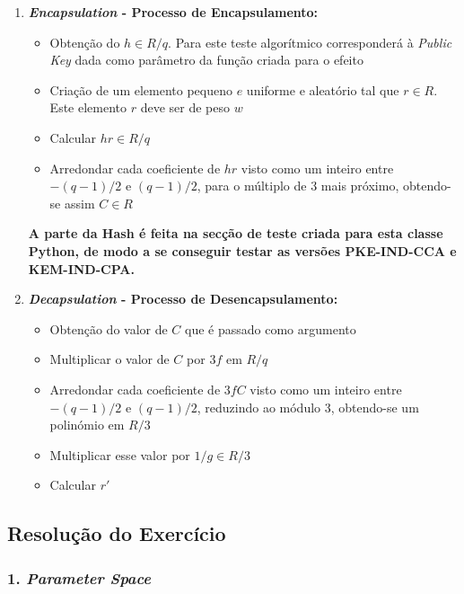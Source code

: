 \documentclass[12pt]{report}
\providecommand{\tightlist}{%
      \setlength{\itemsep}{0pt}\setlength{\parskip}{0pt}}
\begin{document}
\begin{enumerate}
\item
  \textbf{\emph{Encapsulation} - Processo de Encapsulamento:}

  \begin{itemize}
  \tightlist
  \item
    Obtenção do \(h\in{R}/q\). Para este teste algorítmico corresponderá
    à \emph{Public Key} dada como parâmetro da função criada para o
    efeito
  \item
    Criação de um elemento pequeno \(e\) uniforme e aleatório tal que
    \(r\in{R}\). Este elemento \(r\) deve ser de peso \(w\)
  \item
    Calcular \(hr\in{R}/q\)
  \item
    Arredondar cada coeficiente de \(hr\) visto como um inteiro entre
    \(-(q-1)/2\) e \((q-1)/2\), para o múltiplo de 3 mais próximo,
    obtendo-se assim \(C\in{R}\)
  \end{itemize}

  \textbf{A parte da Hash é feita na secção de teste criada para esta
  classe Python, de modo a se conseguir testar as versões PKE-IND-CCA e
  KEM-IND-CPA.}
\vspace{3mm}

\item
  \textbf{\emph{Decapsulation} - Processo de Desencapsulamento:}

  \begin{itemize}
  \tightlist
  \item
    Obtenção do valor de \(C\) que é passado como argumento
  \item
    Multiplicar o valor de \(C\) por \(3f\) em \({R}/q\)
  \item
    Arredondar cada coeficiente de \(3fC\) visto como um inteiro entre
    \(-(q-1)/2\) e \((q-1)/2\), reduzindo ao módulo 3, obtendo-se um
    polinómio em \({R}/3\)
  \item
    Multiplicar esse valor por \(1/g\in{R}/3\)
  \item
    Calcular \(r'\)
  \end{itemize}
\end{enumerate}
\vspace{3mm}

\subsection{Resolução do
Exercício}\label{resoluuxe7uxe3o-do-exercuxedcio}
\vspace{2mm}

    \subsubsection{\texorpdfstring{1. \emph{Parameter
Space}}{1. Parameter Space}}\label{parameter-space}
\end{document}
